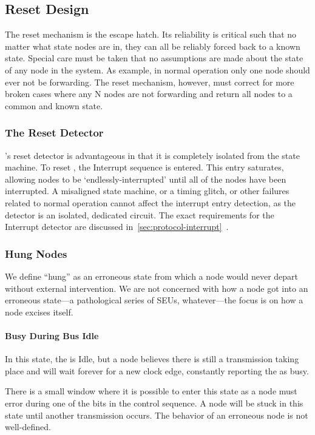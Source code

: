 \subsection{Reset Design}
\label{sec:design-reset}
The reset mechanism is the \bus escape hatch. Its reliability is critical such
that no matter what state \bus nodes are in, they can all be reliably forced
back to a known state. Special care must be taken that no assumptions are made
about the state of any node in the system. As example, in normal operation
only one node should ever not be forwarding. The reset mechanism, however,
must correct for more broken cases where any N nodes are not forwarding and
return all nodes to a common and known state.

\subsubsection{The Reset Detector}
\bus's reset detector is advantageous in that it is completely isolated from
the \bus state machine. To reset \bus, the Interrupt sequence is entered. This
entry saturates, allowing nodes to be `endlessly-interrupted' until all of the
nodes have been interrupted. A misaligned state machine, or a timing glitch,
or other failures related to normal operation cannot affect the interrupt
entry detection, as the detector is an isolated, dedicated circuit. The exact
requirements for the Interrupt detector are discussed
in~\ref{sec:protocol-interrupt}~.

\subsubsection{Hung Nodes}
\label{sec:reset-hung}
We define ``hung'' as an erroneous state from which a node would never depart
without external intervention. We are not concerned with how a node got into
an erroneous state---a pathological series of SEUs, whatever---the focus is on
how a node excises itself.

\paragraph{Busy During Bus Idle}
In this state, the \bus is Idle, but a node believes there is still a
transmission taking place and will wait forever for a new clock edge,
constantly reporting the \bus as busy.

There is a small window where it is possible to enter this state as a node
must error during one of the bits in the control sequence. A node will be
stuck in this state until another transmission occurs. The behavior of an
erroneous node is not well-defined.

